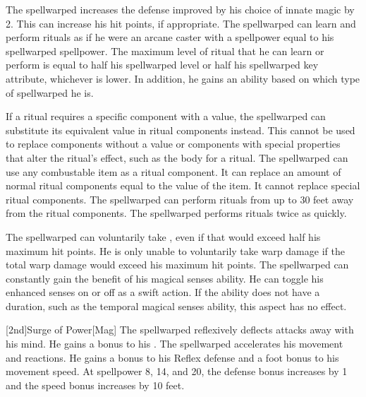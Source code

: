         The spellwarped increases the defense improved by his choice of innate magic by 2.
        This can increase his hit points, if appropriate.
         The spellwarped can learn and perform rituals as if he were an arcane caster with a spellpower equal to his spellwarped spellpower.  The maximum level of ritual that he can learn or perform is equal to half his spellwarped level or half his spellwarped key attribute, whichever is lower.
        In addition, he gains an ability based on which type of spellwarped he is.
        \begin{itemize}
             If a ritual requires a specific component with a value, the spellwarped can substitute its equivalent value in ritual components instead.
                This cannot be used to replace components without a value or components with special properties that alter the ritual's effect, such as the body for a  ritual.
                The spellwarped can use any combustable item as a ritual component.
                It can replace an amount of normal ritual components equal to the value of the item.
                It cannot replace special ritual components.
                The spellwarped can perform rituals from up to 30 feet away from the ritual components.
                The spellwarped performs rituals twice as quickly.
        \end{itemize}
        The spellwarped can voluntarily take , even if that would exceed half his maximum hit points.
        He is only unable to voluntarily take warp damage if the total warp damage would exceed his maximum hit points.
        The spellwarped can constantly gain the benefit of his magical senses ability.
        He can toggle his enhanced senses on or off as a swift action.
        If the ability does not have a duration, such as the temporal magical senses ability, this aspect has no effect.

        [2nd]{Surge of Power}[Mag]
        The spellwarped reflexively deflects attacks away with his mind.
        He gains a  bonus to his .
        The spellwarped accelerates his movement and reactions.
        He gains a  bonus to his Reflex defense and a  foot bonus to his movement speed.
        At spellpower 8, 14, and 20, the defense bonus increases by 1 and the speed bonus increases by 10 feet.

